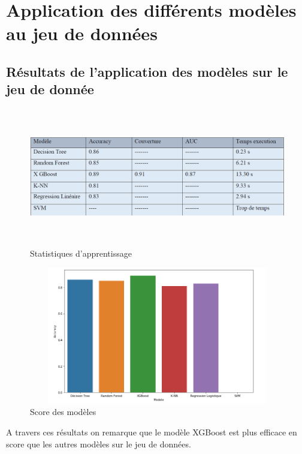 \section{Application des différents modèles au jeu de données}
\subsection{Résultats de l’application des modèles sur le jeu de donnée}
\begin{figure}[h]
\begin{center}
\includegraphics[width=15cm,height=6cm]{images/accuracy_modeles.png}
\caption[Statistiques d'apprentissage]{Statistiques d'apprentissage}
\label{monlabel}
\end{center}
\end{figure}

\begin{figure}[h]
\begin{center}
\includegraphics[width=15cm,height=6cm]{images/diagram_modeles.png}
\caption[Score des modèles]{Score des modèles}
\label{monlabel}
\end{center}
\end{figure}
A travers ces résultats on remarque que le modèle XGBoost est plus efficace en score que les autres modèles sur le jeu de données.

